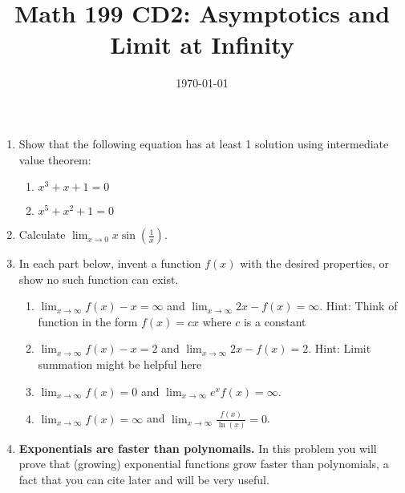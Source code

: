 \documentclass[12pt]{article}
\title{Math 199 CD2: Asymptotics and Limit at Infinity}
\date{\today}
\newcommand{\D}{\displaystyle}
\begin{document}
\maketitle



\begin{enumerate}

\item Show that the following equation has at least 1 solution using intermediate value theorem: 
\begin{enumerate}
	\item $x^3+x+1=0$\vskip 3cm
	\item $x^5+x^2+1=0$\vskip 3cm
\end{enumerate}


\item Calculate $\D\lim_{x\to 0} x \sin\left(\frac{1}{x}\right)$.



\vfill

\vfill

\newpage

\item In each part below, invent a function $f(x)$ with the desired properties, or show no such function can exist.

\begin{enumerate}

\item $\D\lim_{x\to\infty} f(x) - x = \infty$ and $\D\lim_{x\to\infty} 2x - f(x) = \infty$. Hint: Think of function in the form $f(x)=cx$ where $c$ is a constant

\vfill

\item $\D\lim_{x\to\infty} f(x) - x = 2$ and $\D\lim_{x\to\infty} 2x - f(x) = 2$. Hint: Limit summation might be helpful here

\vfill


\item $\D\lim_{x\to\infty} f(x) = 0$ and $\D\lim_{x\to\infty} e^x f(x) = \infty$.

\vfill

\item $\D\lim_{x\to\infty} f(x) = \infty$ and $\D\lim_{x\to\infty} \frac{f(x)}{\ln(x)} = 0$.

\vfill

\end{enumerate}

\newpage

\item \textbf{Exponentials are faster than polynomails.} In this problem you will prove that (growing) exponential functions grow faster than polynomials, a fact that you can cite later and will be very useful.


\end{enumerate}
\end{document}
